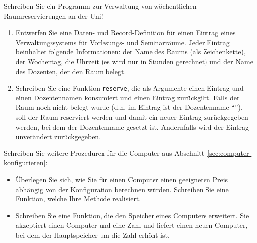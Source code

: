 \begin{aufgabe}

  Schreiben Sie ein Programm zur Verwaltung von wöchentlichen
  Raumreservierungen an der Uni!

  \begin{enumerate}
  \item Entwerfen Sie eine Daten- und Record-Definition für einen Eintrag eines
    Verwaltungssystems für Vorlesungs- und Seminarräume. Jeder Eintrag beinhaltet
    folgende Informationen: der Name des Raums (als Zeichenkette), der Wochentag,
    die Uhrzeit (es wird nur in Stunden gerechnet) und der Name des Dozenten, der
    den Raum belegt.

  \item Schreiben Sie eine Funktion \texttt{reserve}, die als Argumente einen Eintrag und einen
    Dozentennamen konsumiert und einen Eintrag zurückgibt. Falls der Raum noch nicht belegt
    wurde (d.h. im Eintrag ist der Dozentenname "`"'), soll der Raum reserviert werden und
    damit ein neuer Eintrag zurückgegeben werden, bei dem der Dozentenname gesetzt ist.
    Andernfalls wird der Eintrag unverändert zurückgegeben.
  \end{enumerate}
\end{aufgabe}


\begin{aufgabe}

  Schreiben Sie weitere Prozeduren für die Computer aus Abschnitt~\ref{sec:computer-konfigurieren}:
  \begin{itemize}
  \item Überlegen Sie sich, wie Sie für einen Computer einen
    geeigneten Preis abhängig von der Konfiguration berechnen würden.
    Schreiben Sie eine Funktion, welche Ihre Methode realisiert.
  \item Schreiben Sie eine Funktion, die den Speicher eines Computers
    erweitert.  Sie akzeptiert einen Computer und eine Zahl und liefert
    einen neuen Computer, bei dem der Hauptspeicher um die Zahl erhöht
    ist.
  \end{itemize}
\end{aufgabe}

